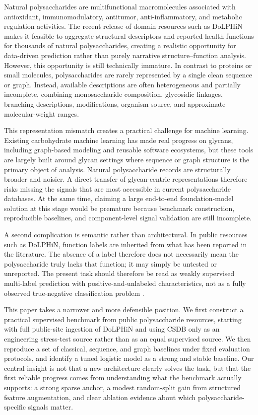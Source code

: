 \documentclass{article}
\begin{document}
Natural polysaccharides are multifunctional macromolecules associated with antioxidant, immunomodulatory, antitumor, anti-inflammatory, and metabolic regulation activities. The recent release of domain resources such as DoLPHiN makes it feasible to aggregate structural descriptors and reported health functions for thousands of natural polysaccharides, creating a realistic opportunity for data-driven prediction rather than purely narrative structure--function analysis. However, this opportunity is still technically immature. In contrast to proteins or small molecules, polysaccharides are rarely represented by a single clean sequence or graph. Instead, available descriptions are often heterogeneous and partially incomplete, combining monosaccharide composition, glycosidic linkages, branching descriptions, modifications, organism source, and approximate molecular-weight ranges.

This representation mismatch creates a practical challenge for machine learning. Existing carbohydrate machine learning has made real progress on glycans, including graph-based modeling and reusable software ecosystems, but these tools are largely built around glycan settings where sequence or graph structure is the primary object of analysis. Natural polysaccharide records are structurally broader and noisier. A direct transfer of glycan-centric representations therefore risks missing the signals that are most accessible in current polysaccharide databases. At the same time, claiming a large end-to-end foundation-model solution at this stage would be premature because benchmark construction, reproducible baselines, and component-level signal validation are still incomplete.

A second complication is semantic rather than architectural. In public resources such as DoLPHiN, function labels are inherited from what has been reported in the literature. The absence of a label therefore does not necessarily mean the polysaccharide truly lacks that function; it may simply be untested or unreported. The present task should therefore be read as weakly supervised multi-label prediction with positive-and-unlabeled characteristics, not as a fully observed true-negative classification problem \cite{jain2016weaklysupervised,li2022pu}.

This paper takes a narrower and more defensible position. We first construct a practical supervised benchmark from public polysaccharide resources, starting with full public-site ingestion of DoLPHiN and using CSDB only as an engineering stress-test source rather than as an equal supervised source. We then reproduce a set of classical, sequence, and graph baselines under fixed evaluation protocols, and identify a tuned logistic model as a strong and stable baseline. Our central insight is not that a new architecture clearly solves the task, but that the first reliable progress comes from understanding what the benchmark actually supports: a strong sparse anchor, a modest random-split gain from structured feature augmentation, and clear ablation evidence about which polysaccharide-specific signals matter.
\end{document}
